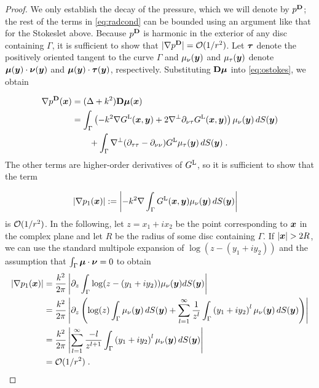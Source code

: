 \begin{proof}
We only establish the
decay of the pressure, which we will denote by $p^{\bf D}$;
the rest of the terms in \eqref{eq:radcond} can be bounded
using an argument like that for the Stokeslet above.
Because $p^{\bf D}$ is harmonic in the exterior of any disc
containing $\Gamma$, it is sufficient to show that
$|\nabla p^{\bf D}| = \mathcal{O} (1/r^2)$. Let ${\boldsymbol \tau}$ denote the
positively oriented tangent to the curve $\Gamma$ and
$\mu_\nu({\boldsymbol y})$ and $\mu_\tau({\boldsymbol y})$ denote ${\boldsymbol \mu}({\boldsymbol y}) \cdot {\boldsymbol \nu}({\boldsymbol y})$ and
${\boldsymbol \mu}({\boldsymbol y}) \cdot {\boldsymbol \tau}({\boldsymbol y})$, respectively. Substituting
${\bf D} {\boldsymbol \mu}$ into \eqref{eq:ostokes}, we obtain

\begin{align*}
\nabla p^{\bf D}({\boldsymbol x}) &= (\Delta + k^2) {\bf D} {\boldsymbol \mu}({\boldsymbol x}) \\
&= \int_\Gamma \left (-k^2 \nabla G^{\textrm{L}} ({\boldsymbol x},{\boldsymbol y}) +
2 \nabla^\perp \partial_{\nu\tau} G^{\textrm{L}} ({\boldsymbol x},{\boldsymbol y}) \right ) \mu_\nu({\boldsymbol y})
\, dS({\boldsymbol y}) \\
& \qquad + \int_\Gamma \nabla^\perp (\partial_{\tau\tau}-\partial_{\nu\nu})G^{\textrm{L}} \mu_\tau({\boldsymbol y})
\, dS({\boldsymbol y}) \; .
\end{align*}
The other terms are higher-order derivatives
of $G^{\textrm{L}}$, so it is sufficient to show that the term

\begin{align*}
|\nabla p_1({\boldsymbol x})| &:= \left |-k^2 \nabla \int_\Gamma G^{\textrm{L}}({\boldsymbol x},{\boldsymbol y})
\mu_\nu({\boldsymbol y}) \, dS({\boldsymbol y}) \right |
\end{align*}
is $\mathcal{O} (1/r^2)$. In the following, let $z = x_1 + i x_2$ be the
point corresponding to ${\boldsymbol x}$ in the complex plane and let $R$
be the radius of some disc containing $\Gamma$. If $|{\boldsymbol x}| > 2R$,
we can use the standard multipole expansion of $\log(z-(y_1+iy_2))$
and the assumption that $\int_\Gamma {\boldsymbol \mu} \cdot {\boldsymbol \nu} = 0$
to obtain
\begin{align*}
|\nabla p_1({\boldsymbol x})| &= \frac{k^2}{2\pi} \left |  \partial_z \int_\Gamma \log(z-(y_1+iy_2))
\mu_\nu({\boldsymbol y}) dS({\boldsymbol y}) \right | \\
&= \frac{k^2}{2\pi} \left |  \partial_z  \left ( \log(z) \int_\Gamma \mu_\nu({\boldsymbol y}) \, dS({\boldsymbol y})
+ \sum_{l=1}^\infty \frac{1}{z^l} \int_\Gamma \left( y_1+iy_2 \right)^l \mu_\nu({\boldsymbol y}) \, dS({\boldsymbol y})
\right ) \right | \\
&= \frac{k^2}{2\pi} \left | \sum_{l=1}^\infty \frac{-l}{z^{l+1}}
\int_\Gamma \left( y_1+iy_2 \right)^l \mu_\nu({\boldsymbol y}) \, dS({\boldsymbol y}) \right | \\
&= \mathcal{O} (1/r^2) \; .
\end{align*}
\end{proof}

